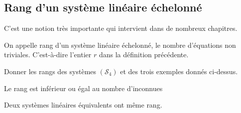 \documentclass[a4paper, 11pt]{article}
\begin{document}
\begin{exemples} 
\end{exemples}

\vspace{0.6cm}


\noindent\subsection{Rang d'un syst\`eme lin\'eaire \'echelonn\'e}


\noindent C'est une notion tr\`es importante qui intervient dans de nombreux chapitres.\vsec\\



{\noindent  

\begin{defi} 
On appelle rang d'un syst\`eme lin\'eaire \'echelonn\'e, le nombre d'équations non triviales. C'est-à-dire l'entier $r$ dans la définition précédente. 
\end{defi}

}

\begin{exemples} 
Donner les rangs des syst\`{e}mes $(\mathcal{S}_4)$ et des trois exemples donn\'es ci-dessus.
\end{exemples}

\begin{rem}
Le rang est inf\'erieur ou \'egal  au  nombre d'inconnues
\end{rem}


\begin{prop}
Deux systèmes linéaires équivalents ont même rang. 
\end{prop}

\vspace{0.5cm}
\end{document}
